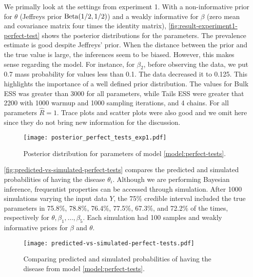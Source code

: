 We primally look at the settings from experiment 1. With a non-informative prior for $\theta$
(Jeffreys prior $\operatorname{Beta}(1/2, 1/2)$) and a weakly informative for $\beta$
(zero mean and covariance matrix four times the identity matrix),
\autoref{fig:result-experiment1-perfect-test} shows the posterior
distributions for the parameters. The prevalence estimate is good despite
Jeffreys' prior. When the distance between the prior and the true value is large, the
inferences seem to be biased. However, this makes sense regarding the model. For
instance, for $\beta_2$, before observing the data, we put 0.7 mass probability
for values less than 0.1. The data decreased it to 0.125. This highlights
the importance of a well defined prior distribution. The values for Bulk ESS
was greater than 3000 for all parameters, while Tails ESS were greater that
2200 with 1000 warmup and 1000 sampling iterations, and 4 chains. For all
parameters $\hat{R} = 1$. Trace plots and scatter plots were also good and we
omit here since they do not bring new information for the discussion. 

\begin{figure}[!ht]
  \centering  
  \caption{\label{fig:result-experiment1-perfect-test}Posterior
  distribution for parameters of model \eqref{model:perfect-tests}.}
  \texttt{[image: posterior\_perfect\_tests\_exp1.pdf]}
\end{figure} 

\autoref{fig:predicted-vs-simulated-perfect-tests} compares the predicted and
simulated probabilities of having the disease $\theta_i$. Although we are performing Bayesian inference, frequentist properties can be
accessed through simulation. After 1000 simulations varying the input data
$Y$, the 75\% credible interval included the true parameters in 75.8\%, 78.8\%,
76.4\%, 77.5\%, 67.3\%, and 72.2\% of the times, respectively for $\theta,
\beta_1, \dots, \beta_5$. Each simulation had 100 samples and weakly
informative priors for $\beta$ and $\theta$.

\begin{figure}[!ht]
  \centering  
  \caption{\label{fig:predicted-vs-simulated-perfect-tests}Comparing predicted
 and simulated probabilities of having the disease from model \eqref{model:perfect-tests}.}
  \texttt{[image: predicted-vs-simulated-perfect-tests.pdf]}
\end{figure} 

